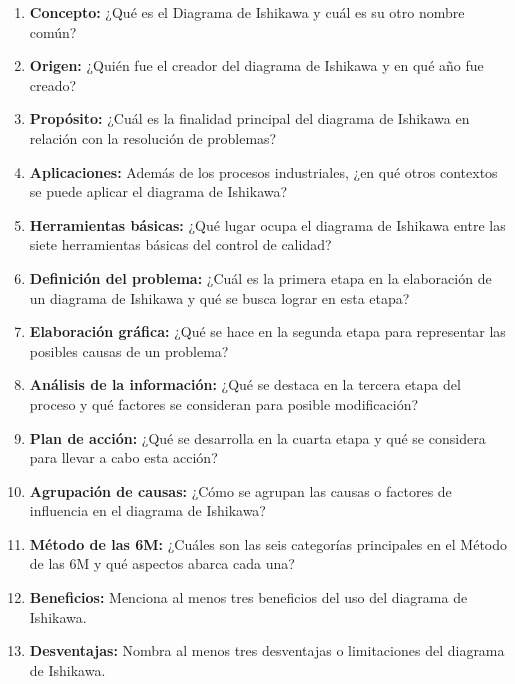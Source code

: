\documentclass[../main]{subfiles}
\begin{document}
\begin{enumerate}
  \item \textbf{Concepto:} ¿Qué es el Diagrama de Ishikawa y cuál es
    su otro nombre común?
  \item \textbf{Origen:} ¿Quién fue el creador del diagrama de
    Ishikawa y en qué año fue creado?
  \item \textbf{Propósito:} ¿Cuál es la finalidad principal del
    diagrama de Ishikawa en relación con la resolución de problemas?
  \item \textbf{Aplicaciones:} Además de los procesos industriales,
    ¿en qué otros contextos se puede aplicar el diagrama de Ishikawa?
  \item \textbf{Herramientas básicas:} ¿Qué lugar ocupa el diagrama
    de Ishikawa entre las siete herramientas básicas del control de calidad?
  \item \textbf{Definición del problema:} ¿Cuál es la primera etapa
    en la elaboración de un diagrama de Ishikawa y qué se busca
    lograr en esta etapa?
  \item \textbf{Elaboración gráfica:} ¿Qué se hace en la segunda
    etapa para representar las posibles causas de un problema?
  \item \textbf{Análisis de la información:} ¿Qué se destaca en la
    tercera etapa del proceso y qué factores se consideran para posible
    modificación?
  \item \textbf{Plan de acción:} ¿Qué se desarrolla en la cuarta
    etapa y qué se considera para llevar a cabo esta acción?
  \item \textbf{Agrupación de causas:} ¿Cómo se agrupan las causas o
    factores de influencia en el diagrama de Ishikawa?
  \item \textbf{Método de las 6M:} ¿Cuáles son las seis categorías
    principales en el Método de las 6M y qué aspectos abarca cada una?
  \item \textbf{Beneficios:} Menciona al menos tres beneficios del
    uso del diagrama de Ishikawa.
  \item \textbf{Desventajas:} Nombra al menos tres desventajas o
    limitaciones del diagrama de Ishikawa.
\end{enumerate}
\end{document}
